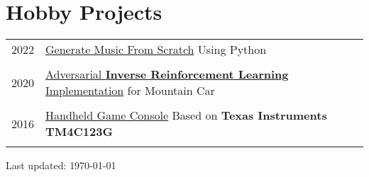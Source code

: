 \documentclass[a4paper,10pt]{article} %
\begin{document}
\section{Hobby Projects}
\begin{tabular}{r|l}	
	2022 &
	\href{https://medium.com/@jackhuang.wz/generate-music-from-scratch-using-python-53c0fedd0031}{Generate Music From Scratch}  Using Python\\
    \multicolumn{2}{c}{} \\	%
    
	2020						&
	\href{https://github.com/HuangJiaLian/AIRL_MountainCar}{Adversarial \textbf{Inverse Reinforcement Learning} Implementation} for Mountain Car \\
	\multicolumn{2}{c}{} \\	%
	
	
	2016                        & \href{https://nbviewer.org/github/HuangJiaLian/DataBase0/blob/e193f936c297a5e97dfd8eae7b8c86288c721623/uPic/2021_12_16_21_Game_Boy.pdf}{Handheld Game Console} Based on \textbf{Texas Instruments TM4C123G}\\
	\multicolumn{2}{c}{} \\	%
\end{tabular}
\begin{flushright} 
Last updated: {\today}
\end{flushright}
\end{document}
